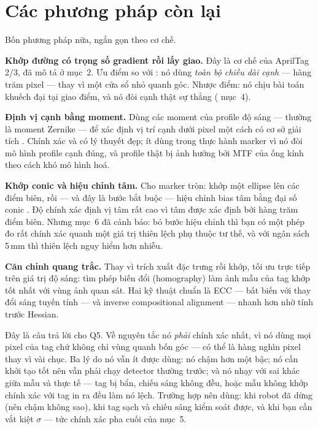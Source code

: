 \documentclass[../../marker.tex]{subfiles}
\begin{document}
\section{Các phương pháp còn lại}

Bốn phương pháp nữa, ngắn gọn theo cơ chế.

\textbf{Khớp đường có trọng số gradient rồi lấy giao.} Đây là cơ chế của AprilTag 2/3, đã mô tả ở  mục~2. Ưu điểm so với : nó dùng \emph{toàn bộ chiều dài cạnh} --- hàng trăm pixel --- thay vì một cửa sổ nhỏ quanh góc. Nhược điểm: nó chịu bài toán khuếch đại tại giao điểm, và nó đòi cạnh thật sự thẳng ( mục~4).

\textbf{Định vị cạnh bằng moment.} Dùng các moment của profile độ sáng --- thường là moment Zernike --- để xác định vị trí cạnh dưới pixel một cách có cơ sở giải tích \cite{ghosal1993orthogonal}. Chính xác và có lý thuyết đẹp; ít dùng trong thực hành marker vì nó đòi mô hình profile cạnh đúng, và profile thật bị ảnh hưởng bởi MTF của ống kính theo cách khó mô hình hoá.

\textbf{Khớp conic và hiệu chỉnh tâm.} Cho marker tròn: khớp một ellipse lên các điểm biên, rồi --- và đây là bước bắt buộc --- hiệu chỉnh bias tâm bằng đại số conic \cite{heikkila2000geometric}. Độ chính xác định vị tâm rất cao vì tâm được xác định bởi hàng trăm điểm biên. Nhưng  mục~6 đã cảnh báo: bỏ bước hiệu chỉnh thì bạn có một phép đo rất chính xác quanh một giá trị thiên lệch phụ thuộc tư thế, và với ngân sách 5\,mm thì thiên lệch nguy hiểm hơn nhiễu.

\textbf{Căn chỉnh quang trắc.} Thay vì trích xuất đặc trưng rồi khớp, tối ưu trực tiếp trên giá trị độ sáng: tìm phép biến đổi (homography) làm ảnh mẫu của tag khớp tốt nhất với vùng ảnh quan sát. Hai kỹ thuật chuẩn là ECC \cite{evangelidis2008ecc} --- bất biến với thay đổi sáng tuyến tính --- và inverse compositional alignment \cite{baker2004lucas} --- nhanh hơn nhờ tính trước Hessian.

Đây là câu trả lời cho Q5. Về nguyên tắc nó \emph{phải} chính xác nhất, vì nó dùng mọi pixel của tag chứ không chỉ vùng quanh bốn góc --- có thể là hàng nghìn pixel thay vì vài chục. Ba lý do nó vẫn ít được dùng: nó chậm hơn một bậc; nó cần khởi tạo tốt nên vẫn phải chạy detector thường trước; và nó nhạy với sai khác giữa mẫu và thực tế --- tag bị bẩn, chiếu sáng không đều, hoặc mẫu không khớp chính xác với tag in ra đều làm nó lệch. Trường hợp nên dùng: khi robot đã dừng (nên chậm không sao), khi tag sạch và chiếu sáng kiểm soát được, và khi bạn cần vắt kiệt \(\sigma\) --- tức chính xác pha cuối của  mục~5.
\end{document}
